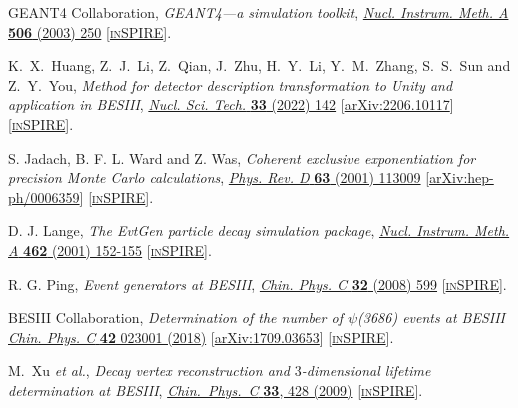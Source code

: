 \documentclass[a4paper,11pt]{article}
\begin{document}
\begin{thebibliography}{**}
GEANT4 Collaboration,  
\textit{GEANT4---a simulation toolkit}, 
\textcolor{blue}{\href{https://doi.org/10.1016/S0168-9002(03)01368-8} {\textit{Nucl. Instrum. Meth. A} \textbf {506} (2003) 250}}
[\textcolor{blue}{\href{https://inspirehep.net/literature/593382 }{\textsc{inSPIRE}}}].

K.~X.~Huang, Z.~J.~Li, Z.~Qian, J.~Zhu, H.~Y.~Li, Y.~M.~Zhang, S.~S.~Sun and Z.~Y.~You,
\textit{Method for detector description transformation to Unity and application in BESIII}, 
\textcolor{blue}{\href{https://doi.org/10.1007/s41365-022-01133-8} {\textit{Nucl. Sci. Tech.} \textbf{33} (2022) 142}} 
[\textcolor{blue}{\href{https://arxiv.org/abs/2206.10117}{arXiv:2206.10117}}]
[\textcolor{blue}{\href{https://inspirehep.net/search?p=find+EPRINT\%2BarXiv\%3A2206.10117 }{\textsc{inSPIRE}}}].

S. Jadach, B. F. L. Ward and Z. Was,
\textit{Coherent exclusive exponentiation for precision Monte Carlo calculations}, 
\textcolor{blue}{ \href{https://doi.org/10.1103/PhysRevD.63.113009} {\textit{Phys. Rev. D} \textbf{63} (2001) 113009}}
[\textcolor{blue}{\href{https://arxiv.org/abs/hep-ph/0006359}{arXiv:hep-ph/0006359}}] 
[\textcolor{blue}{\href{https://inspirehep.net/search?p=find+EPRINT\%2BarXiv\%3Ahep-ph/0006359 }{\textsc{inSPIRE}}}].

D. J. Lange,
\textit{The EvtGen particle decay simulation package}, 
\textcolor{blue}{\href{https://doi.org/10.1016/S0168-9002(01)00089-4} {\textit{Nucl. Instrum. Meth. A} \textbf{462} (2001) 152-155}}
[\textcolor{blue}{\href{https://inspirehep.net/literature/560129}{\textsc{inSPIRE}}}].

R. G. Ping,
\textit{Event generators at BESIII}, 
\textcolor{blue}{ \href{https://doi.org/10.1088/1674-1137/32/8/001} {\textit{Chin. Phys. C} \textbf{32} (2008) 599}}
[\textcolor{blue}{\href{https://inspirehep.net/literature/1111724}{\textsc{inSPIRE}}}].

 BESIII Collaboration,
\textit{Determination of the number of $\psi$(3686) events at BESIII}
\href{https://iopscience.iop.org/article/10.1088/1674-1137/42/2/023001}{\textit{Chin. Phys. C} {\bf 42} 023001 (2018)}
[\textcolor{blue}{\href{https://arxiv.org/pdf/1709.03653.pdf}{arXiv:1709.03653}}] 
[\textcolor{blue}{\href{https://inspirehep.net/literature/1623019}{\textsc{inSPIRE}}}].

 M.~Xu  {\it et al.}, 
\textit{Decay vertex reconstruction and $3$-dimensional lifetime determination at BESIII},
\href{https://iopscience.iop.org/article/10.1088/1674-1137/33/6/005}{\textit{Chin.\ Phys.\ C} {\bf33}, 428 (2009)}
[\textcolor{blue}{\href{https://inspirehep.net/literature/1122428}{\textsc{inSPIRE}}}].


\end{thebibliography}
\end{document}
